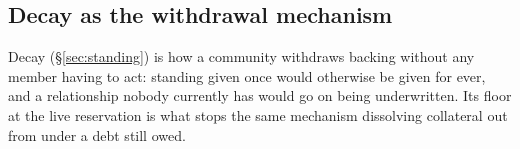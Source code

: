 \subsection{Decay as the withdrawal mechanism}

Decay (\S\ref{sec:standing}) is how a community withdraws backing without any member
having to act: standing given once would otherwise be given for ever, and a relationship
nobody currently has would go on being underwritten. Its floor at the live reservation is
what stops the same mechanism dissolving collateral out from under a debt still owed.
